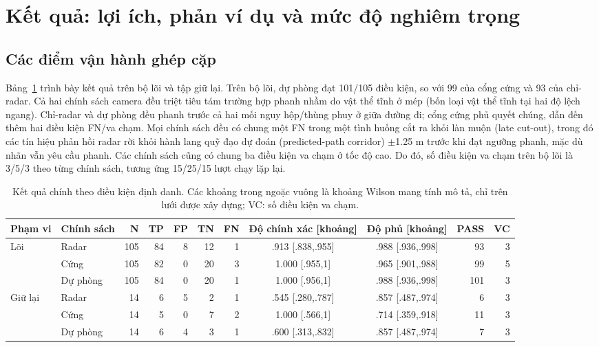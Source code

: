 \documentclass[11pt,a4paper]{article}
\begin{document}
\section{Kết quả: lợi ích, phản ví dụ và mức độ nghiêm trọng}
\subsection{Các điểm vận hành ghép cặp}
Bảng~\ref{tab:primary} trình bày kết quả trên bộ lõi và tập giữ lại. Trên bộ
lõi, dự phòng đạt 101/105 điều kiện, so với 99 của cổng cứng và 93 của
chỉ-radar. Cả hai chính sách camera đều triệt tiêu tám trường hợp phanh nhầm
do vật thể tĩnh ở mép (bốn loại vật thể tĩnh tại hai độ lệch ngang). Chỉ-radar
và dự phòng đều phanh trước cả hai mối nguy hộp/thùng phuy ở giữa đường đi;
cổng cứng phủ quyết chúng, dẫn đến thêm hai điều kiện FN/va chạm. Mọi chính
sách đều có chung một FN trong một tình huống cắt ra khỏi làn muộn (late
cut-out), trong đó các tín hiệu phản hồi radar rời khỏi hành lang quỹ đạo dự
đoán (predicted-path corridor) $\pm$1.25 m trước khi đạt ngưỡng phanh, mặc dù
nhãn vẫn yêu cầu phanh. Các chính sách cũng có chung ba điều kiện va chạm ở tốc
độ cao. Do
đó, số điều kiện va chạm trên bộ lõi là 3/5/3 theo từng chính sách, tương ứng
15/25/15 lượt chạy lặp lại.

\begin{table}[t]
\caption{Kết quả chính theo điều kiện định danh. Các khoảng trong ngoặc vuông
là khoảng Wilson mang tính mô tả, chỉ trên lưới được xây dựng; VC: số điều
kiện va chạm.}
\label{tab:primary}
\centering\footnotesize
\setlength{\tabcolsep}{2pt}
\begin{tabular*}{\textwidth}{@{\extracolsep{\fill}}llrrrrrccrr}
\toprule Phạm vi & Chính sách & N & TP & FP & TN & FN & Độ chính xác [khoảng] & Độ phủ [khoảng] & PASS & VC\\
\midrule
Lõi & Radar & 105 & 84 & 8 & 12 & 1 & .913 [.838,.955] & .988 [.936,.998] & 93 & 3\\
 & Cứng & 105 & 82 & 0 & 20 & 3 & 1.000 [.955,1] & .965 [.901,.988] & 99 & 5\\
 & Dự phòng & 105 & 84 & 0 & 20 & 1 & 1.000 [.956,1] & .988 [.936,.998] & 101 & 3\\
\midrule
Giữ lại & Radar & 14 & 6 & 5 & 2 & 1 & .545 [.280,.787] & .857 [.487,.974] & 6 & 3\\
 & Cứng & 14 & 5 & 0 & 7 & 2 & 1.000 [.566,1] & .714 [.359,.918] & 11 & 3\\
 & Dự phòng & 14 & 6 & 4 & 3 & 1 & .600 [.313,.832] & .857 [.487,.974] & 7 & 3\\
\bottomrule
\end{tabular*}
\end{table}
\end{document}
